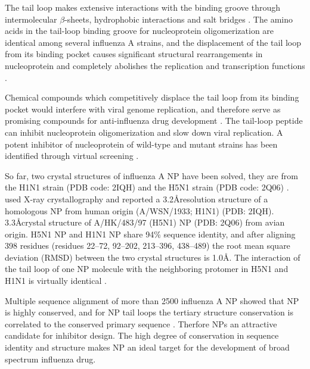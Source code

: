 The tail loop makes extensive interactions with the binding groove through intermolecular $\beta$-sheets, hydrophobic interactions and salt bridges \citep{1140}. The amino acids in the tail-loop binding groove for nucleoprotein oligomerization are identical among several influenza A strains, and the displacement of the tail loop from its binding pocket causes significant structural rearrangements in nucleoprotein and completely abolishes the replication and transcription functions \citep{1231}.

Chemical compounds which competitively displace the tail loop from its binding pocket would interfere with viral genome replication, and therefore serve as promising compounds for anti-influenza drug development \citep{1140,1231,1232}. The tail-loop peptide can inhibit nucleoprotein oligomerization and slow down viral replication. A potent inhibitor of nucleoprotein of wild-type and mutant strains has been identified through virtual screening \citep{1233}.

So far, two crystal structures of influenza A NP have been solved, they are from the H1N1 strain (PDB code: 2IQH) \citep{1140} and the H5N1 strain (PDB code: 2Q06) \citep{1231}. \citep{1140} used X-ray crystallography and reported a 3.2\AA resolution structure of a homologous NP from human origin (A/WSN/1933; H1N1) (PDB: 2IQH). \citep{1231} 3.3\AA crystal structure of A/HK/483/97 (H5N1) NP (PDB: 2Q06) from avian origin. H5N1 NP and H1N1 NP share 94\% sequence identity, and after aligning 398 residues (residues 22–72, 92–202, 213–396, 438–489) the root mean square deviation (RMSD) between the two crystal structures is 1.0\AA \citep{1140}. The interaction of the tail loop of one NP molecule with the neighboring protomer in H5N1 and H1N1 is virtually identical \citep{1140}.

Multiple sequence alignment of more than 2500 influenza A NP showed that NP is highly conserved, and for NP tail loops the tertiary structure conservation is correlated to the conserved primary sequence \citep{1517}. Therfore NPs an attractive candidate for inhibitor design. The high degree of conservation in sequence identity and structure makes NP an ideal target for the development of broad spectrum influenza drug.%

